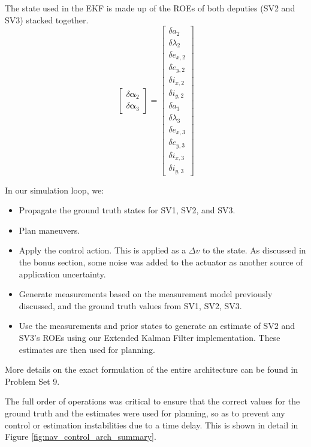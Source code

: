 The state used in the EKF is made up of the ROEs of both deputies (SV2 and SV3) stacked together.
\begin{equation}
\begin{bmatrix}
\delta \boldsymbol{\alpha}_2 \\
\hline
\delta \boldsymbol{\alpha}_3
\end{bmatrix}
=
\begin{bmatrix}
\delta a_2 \\
\delta \lambda_2 \\
\delta e_{x,2} \\
\delta e_{y,2} \\
\delta i_{x,2} \\
\delta i_{y,2} \\
\hline
\delta a_3 \\
\delta \lambda_3 \\
\delta e_{x,3} \\
\delta e_{y,3} \\
\delta i_{x,3} \\
\delta i_{y,3}
\end{bmatrix}
\end{equation}




In our simulation loop, we:
\begin{itemize}
    \item Propagate the ground truth states for SV1, SV2, and SV3. 
    \item Plan maneuvers. 
    \item Apply the control action. This is applied as a $\Delta v$ to the state. As discussed in the bonus section, some noise was added to the actuator as another source of application uncertainty.
    \item Generate measurements based on the measurement model previously discussed, and the ground truth values from SV1, SV2, SV3.
    \item Use the measurements and prior states to generate an estimate of SV2 and SV3's ROEs using our Extended Kalman Filter implementation. These estimates are then used for planning.
\end{itemize}

More details on the exact formulation of the entire architecture can be found in Problem Set 9. 

The full order of operations was critical to ensure that the correct values for the ground truth and the estimates were used for planning, so as to prevent any control or estimation instabilities due to a time delay. This is shown in detail in Figure \ref{fig:nav_control_arch_summary}.

